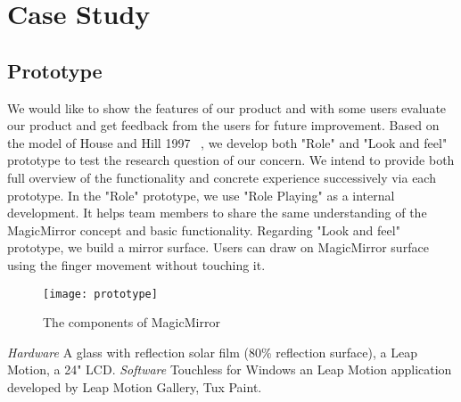 
\section{Case Study}
\subsection{Prototype}
We would like to show the features of our product and with some users evaluate our product and get feedback from the users for future improvement.
Based on the model of House and Hill 1997 ~\cite{houdeChapter16What1997}, we develop both "Role" and "Look and feel" prototype to test the research question of our concern. We intend to provide both full overview of the functionality and concrete experience successively via each prototype.
In the "Role" prototype, we use "Role Playing" as a internal development. It helps team members to share the same understanding of the MagicMirror concept and basic functionality. Regarding "Look and feel" prototype, we build a mirror surface. Users can draw on MagicMirror surface using the finger movement without touching it.
\begin{figure}[h]
\caption{The components of MagicMirror}
\centering
\texttt{[image: prototype]}
\end{figure}
\linebreak
\textit{Hardware}
A glass with reflection solar film (80\% reflection surface), a Leap Motion, a 24" LCD.
\textit{Software}
Touchless for Windows an Leap Motion application developed by Leap Motion Gallery, Tux Paint.

